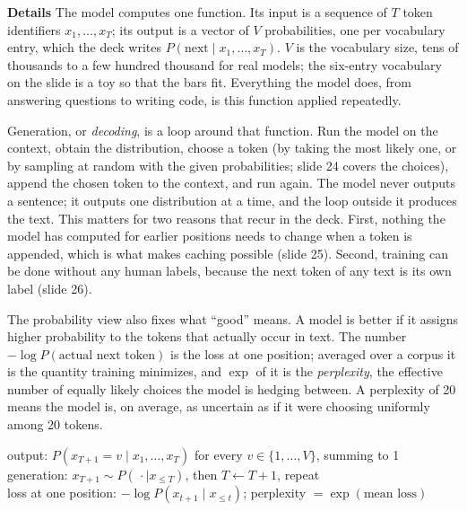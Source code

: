 \documentclass[11pt,letterpaper]{article}
\newcommand{\para}[1]{\medskip\noindent\textbf{#1}\quad}
\newenvironment{formulas}{\begin{tcolorbox}[formulabox]}{\end{tcolorbox}}
\begin{document}
\para{Details} The model computes one function. Its input is a sequence of $T$ token identifiers $x_1,\dots,x_T$; its output is a vector of $V$ probabilities, one per vocabulary entry, which the deck writes $P(\text{next}\mid x_1,\dots,x_T)$. $V$ is the vocabulary size, tens of thousands to a few hundred thousand for real models; the six-entry vocabulary on the slide is a toy so that the bars fit. Everything the model does, from answering questions to writing code, is this function applied repeatedly.

Generation, or \emph{decoding}, is a loop around that function. Run the model on the context, obtain the distribution, choose a token (by taking the most likely one, or by sampling at random with the given probabilities; slide 24 covers the choices), append the chosen token to the context, and run again. The model never outputs a sentence; it outputs one distribution at a time, and the loop outside it produces the text. This matters for two reasons that recur in the deck. First, nothing the model has computed for earlier positions needs to change when a token is appended, which is what makes caching possible (slide 25). Second, training can be done without any human labels, because the next token of any text is its own label (slide 26).

The probability view also fixes what ``good'' means. A model is better if it assigns higher probability to the tokens that actually occur in text. The number $-\log P(\text{actual next token})$ is the loss at one position; averaged over a corpus it is the quantity training minimizes, and $\exp$ of it is the \emph{perplexity}, the effective number of equally likely choices the model is hedging between. A perplexity of 20 means the model is, on average, as uncertain as if it were choosing uniformly among 20 tokens.

\begin{formulas}
output: $P(x_{T+1}=v\mid x_1,\dots,x_T)$ for every $v\in\{1,\dots,V\}$, summing to 1 \\[3pt]
generation: $x_{T+1}\sim P(\,\cdot\mid x_{\le T})$, then $T\leftarrow T+1$, repeat \\[3pt]
loss at one position: $-\log P(x_{t+1}\mid x_{\le t})$; \quad perplexity $=\exp(\text{mean loss})$
\end{formulas}
\end{document}
